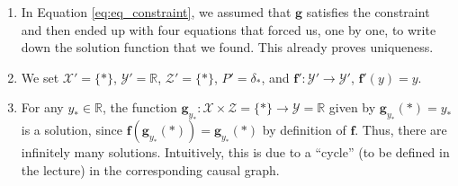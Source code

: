 \begin{enumerate}
\begin{enumerate}
\begin{gradedsolution}
\begin{enumerate}
	If we do this, we end up with the following solution function:
	\begin{equation}
		\boldsymbol{g}(y) = \begin{pmatrix} 3y - 4 \\ -2y + 4 \\ 6y - 8 \\ 18y^{2} - 50y + 36\end{pmatrix}.
		\label{eq:the_solution_function}
	\end{equation}
	Finally, we need to show that this satisfies the structural equation.
	This holds of course by construction, but here is the formal proof:
	\begin{align*}
		\boldsymbol{f}(y, \boldsymbol{g}(y)) & = f 
		\begin{pmatrix} y \\ 3y - 4 \\ -2y + 4 \\ 6y - 8 \\ 18y^{2} - 50y + 36\end{pmatrix}  
		= \begin{pmatrix} 3y - 4 \\ y - (3y - 4) \\ 2(3y - 4) \\ -2y + 4 + (6y - 8) \cdot (3y - 4)\end{pmatrix} \\
		& = \begin{pmatrix} 3y - 4 \\ -2y + 4 \\ 6y - 8 \\ 18y^{2} - 50y + 36 \end{pmatrix}
		= \boldsymbol{g}(y),
		\label{eq:verify_solution}
	\end{align*}
	which verifies the solution.
	\item In Equation \eqref{eq:eq_constraint}, we assumed that $\boldsymbol{g}$ satisfies the constraint and then ended up with four equations that forced us, one by one, to write down the solution function that we found.
	This already proves uniqueness.
	\item We set $\boldsymbol{\mathcal{X}}' = \{*\}$, $\boldsymbol{\mathcal{Y}}' = \mathbb{R}$, $\boldsymbol{\mathcal{Z}}' = \{*\}$, $P' = \delta_{*}$, and $\boldsymbol{f}': \boldsymbol{\mathcal{Y}}' \to \boldsymbol{\mathcal{Y}}'$, $\boldsymbol{f}'(y) = y$.
	\item For any $y_* \in \mathbb{R}$, the function $\boldsymbol{g}_{y_*}: \boldsymbol{\mathcal{X}} \times \boldsymbol{\mathcal{Z}} = \{*\} \to \boldsymbol{\mathcal{Y}} = \mathbb{R}$ given by $\boldsymbol{g}_{y_*}(*) = y_*$ is a solution, since $\boldsymbol{f}(\boldsymbol{g}_{y_*}(*)) = \boldsymbol{g}_{y_*}(*)$ by definition of $\boldsymbol{f}$.
	Thus, there are infinitely many solutions. 
	Intuitively, this is due to a ``cycle'' (to be defined in the lecture) in the corresponding causal graph.
\end{enumerate}
\end{gradedsolution}
\end{enumerate}


\end{enumerate}
